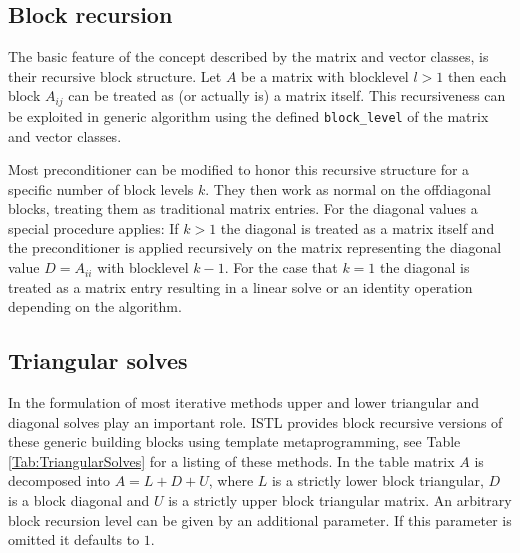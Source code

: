 \documentclass[11pt]{article}
\begin{document}
\subsection{Block recursion}

The basic feature of the concept described by the matrix and vector
classes, is their recursive block structure. Let $A$ be a
matrix with blocklevel $l>1$ then each block $A_{ij}$ can be treated
as (or actually is) a matrix itself. This recursiveness can be
exploited in generic algorithm using the defined
\lstinline!block_level! of the matrix and vector classes.

Most preconditioner can be modified to honor this recursive
structure for a specific number of block levels $k$. They then work as
normal on the offdiagonal blocks, treating them as traditional matrix
entries. For the diagonal values a special procedure applies:  If
$k>1$ the diagonal is treated as a matrix itself and the preconditioner
is applied recursively on the matrix representing the diagonal value
$D=A_{ii}$ with blocklevel $k-1$. For the case that $k=1$ the diagonal
is treated as a 
matrix entry resulting in a linear solve or an identity operation
depending on the algorithm. 

\subsection{Triangular solves}

In the formulation of most iterative methods upper and lower
triangular and diagonal solves play an important role. 
ISTL provides block recursive versions of these generic 
building blocks using template metaprogramming, see Table
\ref{Tab:TriangularSolves} for a listing of these methods. In the table matrix
$A$ is decomposed into $A=L+D+U$, where $L$ is a strictly lower block
triangular, $D$ is a block diagonal and $U$ is a strictly upper block
triangular matrix. An arbitrary block recursion level can be given by an
additional parameter. If this parameter is omitted it defaults to $1$.
\end{document}
